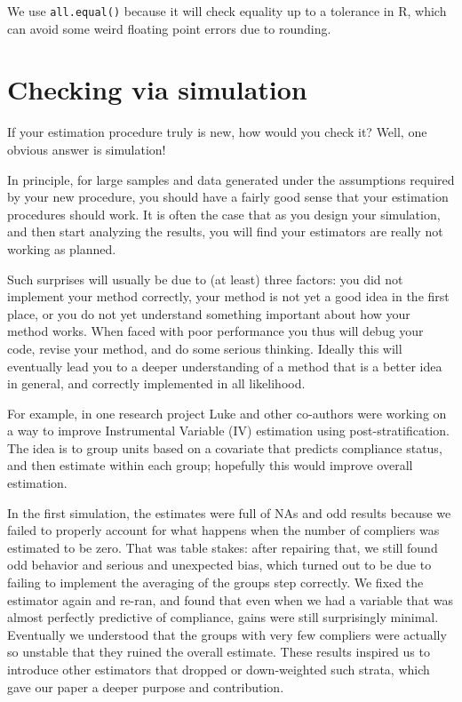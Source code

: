 \documentclass[
]{book}
\begin{document}
We use \texttt{all.equal()} because it will check equality up to a tolerance in R, which can avoid some weird floating point errors due to rounding.

\section{Checking via simulation}\label{checking-via-simulation}

If your estimation procedure truly is new, how would you check it?
Well, one obvious answer is simulation!

In principle, for large samples and data generated under the assumptions required by your new procedure, you should have a fairly good sense that your estimation procedures should work.
It is often the case that as you design your simulation, and then start analyzing the results, you will find your estimators are really not working as planned.

Such surprises will usually be due to (at least) three factors: you did not implement your method correctly, your method is not yet a good idea in the first place, or you do not yet understand something important about how your method works.
When faced with poor performance you thus will debug your code, revise your method, and do some serious thinking.
Ideally this will eventually lead you to a deeper understanding of a method that is a better idea in general, and correctly implemented in all likelihood.

For example, in one research project Luke and other co-authors were working on a way to improve Instrumental Variable (IV) estimation using post-stratification.
The idea is to group units based on a covariate that predicts compliance status, and then estimate within each group; hopefully this would improve overall estimation.

In the first simulation, the estimates were full of NAs and odd results because we failed to properly account for what happens when the number of compliers was estimated to be zero.
That was table stakes: after repairing that, we still found odd behavior and serious and unexpected bias, which turned out to be due to failing to implement the averaging of the groups step correctly.
We fixed the estimator again and re-ran, and found that even when we had a variable that was almost perfectly predictive of compliance, gains were still surprisingly minimal.
Eventually we understood that the groups with very few compliers were actually so unstable that they ruined the overall estimate.
These results inspired us to introduce other estimators that dropped or down-weighted such strata, which gave our paper a deeper purpose and contribution.
\end{document}
